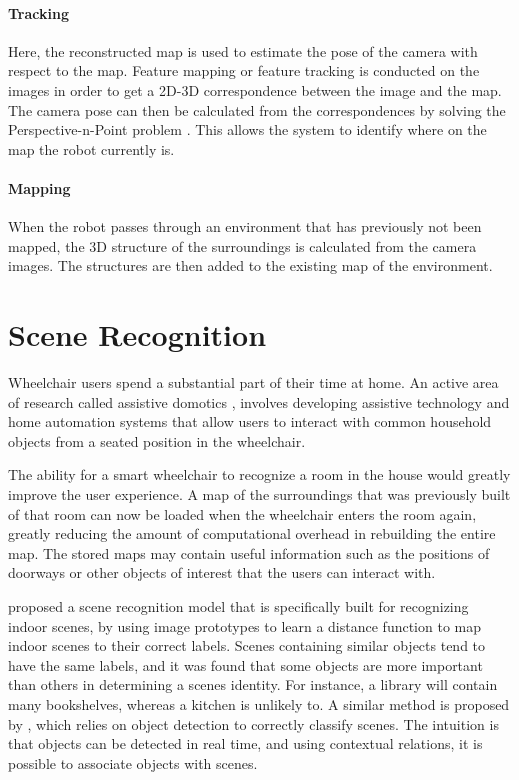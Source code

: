 \documentclass[12pt,a4paper]{report}
\begin{document}
\paragraph{Tracking}
Here, the reconstructed map is used to estimate the pose of the camera with respect to the map. Feature mapping or feature tracking is conducted on the images in order to get a 2D-3D correspondence between the image and the map. The camera pose can then be calculated from the correspondences by solving the Perspective-n-Point problem \citep{Nister2004}. This allows the system to identify where on the map the robot currently is.

\paragraph{Mapping}
When the robot passes through an environment that has previously not been mapped, the 3D structure of the surroundings is calculated from the camera images. The structures are then added to the existing map of the environment.

\section{Scene Recognition}
Wheelchair users spend a substantial part of their time at home. An active area of research called assistive domotics \citep{Rosslin2010}, involves developing assistive technology and home automation systems that allow users to interact with common household objects from a seated position in the wheelchair.

The ability for a smart wheelchair to recognize a room in the house would greatly improve the user experience. A map of the surroundings that was previously built of that room can now be loaded when the wheelchair enters the room again, greatly reducing the amount of computational overhead in rebuilding the entire map. The stored maps may contain useful information such as the positions of doorways or other objects of interest that the users can interact with.

\cite{Quattoni2009} proposed a scene recognition model that is specifically built for recognizing indoor scenes, by using image prototypes to learn a distance function to map indoor scenes to their correct labels. Scenes containing similar objects tend to have the same labels, and it was found that some objects are more important than others in determining a scenes identity. For instance, a library will contain many bookshelves, whereas a kitchen is unlikely to. A similar method is proposed by \cite{Espinace2010}, which relies on object detection to correctly classify scenes. The intuition is that objects can be detected in real time, and using contextual relations, it is possible to associate objects with scenes.
\end{document}
